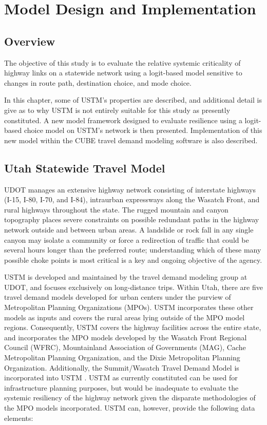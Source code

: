 \chapter{Model Design and Implementation}
\label{chp:chapter3}
\graphicspath{{figures/}{figures/chapter3/}}

\section{Overview} \label{Overview}

The objective of this study is to evaluate the relative systemic
criticality of highway links on a statewide network using a logit-based model
sensitive to changes in route path, destination choice, and mode choice.

In this chapter, some of USTM's properties are described, and additional detail is give as to why
USTM is not entirely suitable for this study as presently constituted. A new
model framework designed to evaluate resilience using a logit-based choice model on
USTM's network is then presented. Implementation of this new model within the CUBE travel demand
modeling software is also described.

\section{Utah Statewide Travel Model} \label{Utah Statewide Travel Model}

UDOT manages an extensive highway
network consisting of interstate highways (I-15, I-80, I-70, and I-84),
intraurban expressways along the Wasatch Front, and rural highways throughout
the state. The rugged mountain and canyon topography places
severe constraints on possible redundant paths in the highway network outside and between urban areas. A
landslide or rock fall in any single canyon may isolate a community or force a
redirection of traffic that could be several hours longer than the preferred
route; understanding which of these many possible choke points is most
critical is a key and ongoing objective of the agency.

USTM is developed and maintained by
the travel demand modeling group at UDOT, and focuses exclusively on
long-distance trips. Within Utah, there are five travel
demand models developed for urban centers under the purview of  Metropolitan
Planning Organizations (MPOs). USTM incorporates these other models as inputs and covers
the rural areas lying outside of the MPO model regions. Consequently, USTM covers the
highway facilities across the entire state, and incorporates the MPO models
developed by the Wasatch Front Regional Council (WFRC), Mountainland
Association of Governments (MAG), Cache Metropolitan Planning Organization, and the Dixie Metropolitan Planning Organization. Additionally,
the Summit/Wasatch Travel Demand Model is incorporated into USTM \citep{udot2021}.
USTM as currently
constituted can be used for infrastructure planning purposes, but would be
inadequate to evaluate the systemic resiliency of the highway network given
the disparate methodologies of the MPO models incorporated. USTM can, however, provide the
following data elements:

